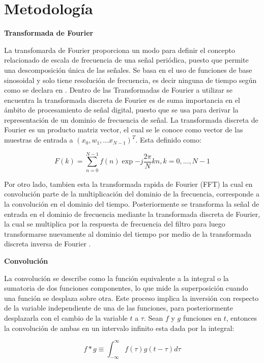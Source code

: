 \documentclass[eng]{ajceam-class}
\begin{document}
\section{Metodología}


    \textbf{Transformada de Fourier}

La transfomarda de Fourier proporciona un modo para definir el concepto relacionado de escala de frecuencia de una señal periódica, puesto que permite una descomposición única de las señales. Se basa en el uso de funciones de base sinosoidal y solo tiene resolución de frecuencia, es decir ninguna de tiempo según como se declara en \cite{Filchev2020}. Dentro de las Transformadas de Fourier a utilizar se encuentra la transformada discreta de Fourier es de suma importancia en el ámbito de procesamiento de señal digital, puesto que se usa para derivar la representación de un dominio de frecuencia de señal. \cite{Giannakopoulos2014} La transformada discreta de Fourier es un producto matriz vector, el cual se le conoce como vector de las muestras de entrada a $(x_{0},w_{1},...x_{N-1})^T$. Esta definido como:

\begin{equation} \label{ec-1}
 F(k)=\sum_{n=0}^{N-1} f(n) \exp{-j\frac{2\pi}{N}kn}, k=0,...,N-1
\end{equation}

Por otro lado, tambien esta la transformada rapida de Fourier (FFT) la cual en convolución parte de la multiplicación del dominio de la frecuencia, corresponde a la convolución en el dominio del tiempo. Posteriormente se transforma la señal de entrada en el dominio de frecuencia mediante la transformada discreta de Fourier, la cual se multiplica por la respuesta de frecuencia del filtro para luego transformarse nuevamente al dominio del tiempo por medio de la transformada discreta inversa de Fourier \cite{Smith2003}.

\textbf{Convolución}


La convolución se describe como la función equivalente a la integral o la sumatoria de dos funciones componentes, lo que mide la superposición cuando una función se desplaza sobre otra. Este proceso implica la inversión con respecto de la variable independiente de una de las funciones, para posteriormente desplazarla con el cambio de la variable  $t$ a $\tau$. Sean $f$ y $g$ funciones en $t$, entonces la convolución de ambas en un intervalo infinito esta dada por la integral\cite{kim2013applications}:

\begin{equation} \label{ec-1}
 f*g \equiv \int_{-\infty}^{\infty} f(\tau)g(t-\tau) d\tau
\end{equation}
\end{document}
